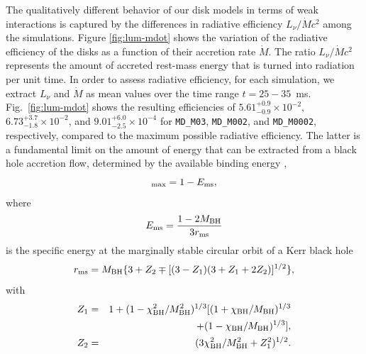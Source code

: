 The qualitatively different behavior of our disk models in terms of weak interactions is captured by the differences in radiative efficiency $L_\nu/\dot M c^2$ among the simulations. Figure \ref{fig:lum-mdot} shows the variation of the radiative efficiency of the disks as a function of their accretion rate $\dot M$. The ratio $L_\nu/\dot M c^2$ represents the amount of accreted rest-mass energy that is turned into radiation per unit time. In order to assess radiative efficiency, for each simulation, we extract $L_\nu$ and $\dot M$ as mean values over the time range $t = 25-35$~ms. Fig.~\ref{fig:lum-mdot} shows the resulting efficiencies of $5.61^{+0.9}_{-0.9}\times 10^{-2}$, $6.73^{+3.7}_{-1.8}\times 10^{-2}$, and $9.01^{+6.0}_{-2.5}\times 10^{-4}$ for \texttt{MD\_M03}, \texttt{MD\_M002}, and \texttt{MD\_M0002}, respectively, compared to the maximum possible radiative efficiency. The latter is a fundamental limit on the amount of energy that can be extracted from a black hole accretion flow, determined by the available binding energy \cite{thorne_disk-accretion_1974}, 
\begin{equation}
    [L_\nu/\dot M c^2]_{\rm max} = 1 - E_{\rm ms},
\end{equation}
where
\begin{equation}
    E_{\rm ms} = \frac{1 - 2M_{\rm BH}}{3r_{\rm ms}}
\end{equation}
is the specific energy at the marginally stable circular orbit of a Kerr black hole \cite{bardeen_rotating_1972}
\begin{equation}
    r_{\rm ms} = M_{\rm BH}\{3 + Z_2 \mp [(3 - Z_1)(3 + Z_1 + 2Z_2)]^{1/2}\},
\end{equation}
with
\begin{eqnarray}
    Z_1 &=& 1 + (1 - \chi_{\rm BH}^2/M_{\rm BH}^2)^{1/3}[(1 + \chi_{\rm BH}/M_{\rm BH})^{1/3} \nonumber\\
    &&+ (1 - \chi_{\rm BH}/M_{\rm BH})^{1/3}], \\
    Z_2 &=& (3\chi_{\rm BH}^2/M_{\rm BH}^2 + Z_1^2)^{1/2}.
\end{eqnarray}


